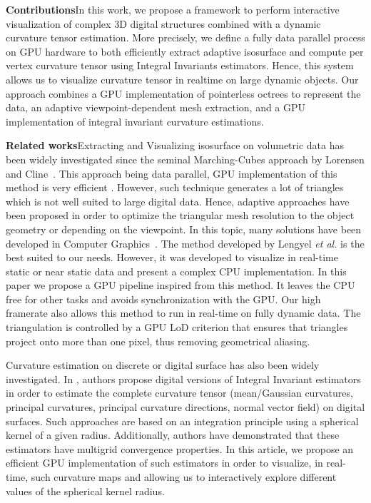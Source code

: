 \documentclass{llncs}
\begin{document}
\noindent\textbf{Contributions}\quad In this work, we propose a
framework to perform interactive visualization of complex 3D digital
structures combined with a dynamic curvature tensor estimation. More
precisely, we define a fully data parallel process on GPU hardware  to
both efficiently extract adaptive isosurface and compute per vertex
curvature tensor using Integral Invariants estimators. Hence, this
system allows us to visualize curvature tensor in realtime on large
dynamic objects. Our approach combines a GPU implementation of
pointerless octrees to represent the data, an adaptive
viewpoint-dependent mesh extraction, and a GPU implementation of
integral invariant curvature estimations.


\vspace{0.2cm}

\sloppy\noindent\textbf{Related works}\quad Extracting and Visualizing
isosurface on volumetric data has been widely investigated since the
seminal Marching-Cubes approach by Lorensen and
Cline~\cite{lorensen1987marching}. This approach being data parallel,
GPU implementation of this method is very efficient
\cite{tatarchuk2007real}. However, such technique generates a lot of
triangles which is not well suited to large digital data. Hence,
adaptive approaches have been proposed in order to optimize the
triangular mesh resolution to the object geometry or depending on the
viewpoint. In this topic, many solutions have been developed in
Computer
Graphics~\cite{shu1995adaptive,schaefer2004dual,lengyel2010voxel,DBLP:journals/cgf/LewinerMPPL10,DBLP:journals/cvgip/LobelloDD14}.
The method developed by Lengyel \textit{et al.}
\cite{lengyel2010voxel} is the best suited to our needs.  However, it
was developed to visualize in real-time static or near static data and
present a complex CPU implementation.  In this paper we propose a GPU
pipeline inspired from this method.  It leaves the CPU free for other
tasks and avoids synchronization with the GPU.  Our high framerate
also allows this method to run in real-time on fully dynamic data.
The triangulation is controlled by a GPU LoD criterion that ensures
that triangles project onto more than one pixel, thus removing
geometrical aliasing.

Curvature estimation on discrete or digital surface has also been
widely investigated. In \cite{CVIU2014}, authors propose digital
versions of Integral Invariant estimators
\cite{Pottmann2007,Pottmann2009} in order to estimate the complete
curvature tensor (mean/Gaussian curvatures, principal curvatures,
principal curvature directions, normal vector field) on digital
surfaces. Such approaches are based on an integration principle using
a spherical kernel of a given radius. Additionally, authors have
demonstrated that these estimators have multigrid convergence
properties. In this article, we propose an efficient GPU
implementation of such estimators in order to visualize, in real-time,
such curvature maps and allowing us to interactively explore different
values of the spherical kernel radius.
\end{document}
